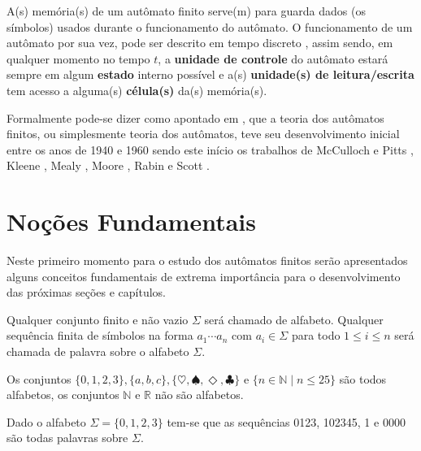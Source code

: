 A(s) memória(s) de um autômato finito serve(m) para guarda dados (os símbolos) usados durante o funcionamento do autômato. O funcionamento de um autômato por sua vez, pode ser descrito em tempo discreto \cite{valdi2016master, valdi2020phd}, assim sendo, em qualquer momento  no tempo $t$, a \textbf{unidade de controle} do autômato estará sempre em algum \textbf{estado} interno possível e a(s) \textbf{unidade(s) de leitura/escrita} tem acesso a alguma(s)  \textbf{célula(s)} da(s) memória(s). 

Formalmente pode-se dizer como apontado em \cite{valdi2020phd}, que a teoria dos autômatos finitos, ou simplesmente teoria dos autômatos, teve seu desenvolvimento inicial entre os anos de 1940 e 1960 sendo este início os trabalhos de McCulloch e Pitts \cite{mcculloch1943}, Kleene \cite{kleene1951}, Mealy \cite{mealy1955}, Moore \cite{moore1956}, Rabin e Scott \cite{rabin1963, rabin1959}. %

\section{Noções Fundamentais}\label{sec:FundamentalFormalLanguage}

Neste primeiro momento para o estudo dos autômatos finitos serão apresentados alguns conceitos fundamentais de extrema importância para o desenvolvimento das próximas seções e capítulos.

\begin{definicao}\label{def:AlfabetoPalavra}
	\cite{valdi2016master} Qualquer conjunto finito e não vazio $\Sigma$ será chamado de alfabeto. Qualquer sequência finita de símbolos na forma $a_1\cdots a_n$ com $a_i \in \Sigma$ para todo $1 \leq i \leq n$ será chamada de palavra sobre o alfabeto $\Sigma$.
\end{definicao}

\begin{exemplo}
	Os conjuntos $\{0, 1, 2, 3\}, \{a, b, c\}, \{\heartsuit,\spadesuit, \Diamond, \clubsuit\}$ e $\{n \in \mathbb{N} \mid n \leq 25\}$ são todos alfabetos, os conjuntos $\mathbb{N}$ e $\mathbb{R}$ não são alfabetos.
\end{exemplo}

\begin{exemplo}
	Dado o alfabeto $\Sigma = \{0, 1, 2, 3\}$ tem-se que as sequências 0123, 102345, 1 e 0000 são todas palavras sobre $\Sigma$.
\end{exemplo}

